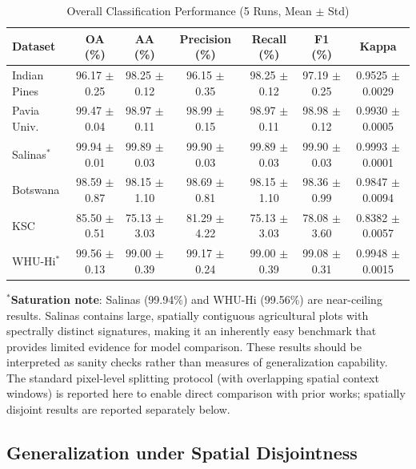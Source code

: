\documentclass[conference]{IEEEtran}
\begin{document}
{\begin{table}[!t]
\caption{Overall Classification Performance (5 Runs, Mean $\pm$ Std)}
\label{tab:overall_results}
\centering
\begin{tabular}{lcccccc}
\toprule
\textbf{Dataset} & \textbf{OA (\%)} & \textbf{AA (\%)} & \textbf{Precision (\%)} & \textbf{Recall (\%)} & \textbf{F1 (\%)} & \textbf{Kappa} \\
\midrule
Indian Pines & 96.17 $\pm$ 0.25 & 98.25 $\pm$ 0.12 & 96.15 $\pm$ 0.35 & 98.25 $\pm$ 0.12 & 97.19 $\pm$ 0.25 & 0.9525 $\pm$ 0.0029 \\
Pavia Univ. & 99.47 $\pm$ 0.04 & 98.97 $\pm$ 0.11 & 98.99 $\pm$ 0.15 & 98.97 $\pm$ 0.11 & 98.98 $\pm$ 0.12 & 0.9930 $\pm$ 0.0005 \\
Salinas$^*$ & 99.94 $\pm$ 0.01 & 99.89 $\pm$ 0.03 & 99.90 $\pm$ 0.03 & 99.89 $\pm$ 0.03 & 99.90 $\pm$ 0.03 & 0.9993 $\pm$ 0.0001 \\
Botswana & 98.59 $\pm$ 0.87 & 98.15 $\pm$ 1.10 & 98.69 $\pm$ 0.81 & 98.15 $\pm$ 1.10 & 98.36 $\pm$ 0.99 & 0.9847 $\pm$ 0.0094 \\
KSC & 85.50 $\pm$ 0.51 & 75.13 $\pm$ 3.03 & 81.29 $\pm$ 4.22 & 75.13 $\pm$ 3.03 & 78.08 $\pm$ 3.60 & 0.8382 $\pm$ 0.0057 \\
WHU-Hi$^*$ & 99.56 $\pm$ 0.13 & 99.00 $\pm$ 0.39 & 99.17 $\pm$ 0.24 & 99.00 $\pm$ 0.39 & 99.08 $\pm$ 0.31 & 0.9948 $\pm$ 0.0015 \\
\bottomrule
\end{tabular}
\begin{flushleft}
\footnotesize{$^*$\textbf{Saturation note}: Salinas (99.94\%) and WHU-Hi (99.56\%) are near-ceiling results. Salinas contains large, spatially contiguous agricultural plots with spectrally distinct signatures, making it an inherently easy benchmark that provides limited evidence for model comparison. These results should be interpreted as sanity checks rather than measures of generalization capability. The standard pixel-level splitting protocol (with overlapping spatial context windows) is reported here to enable direct comparison with prior works; spatially disjoint results are reported separately below.}
\end{flushleft}
\end{table}

\subsection{Generalization under Spatial Disjointness}

}
\end{document}
